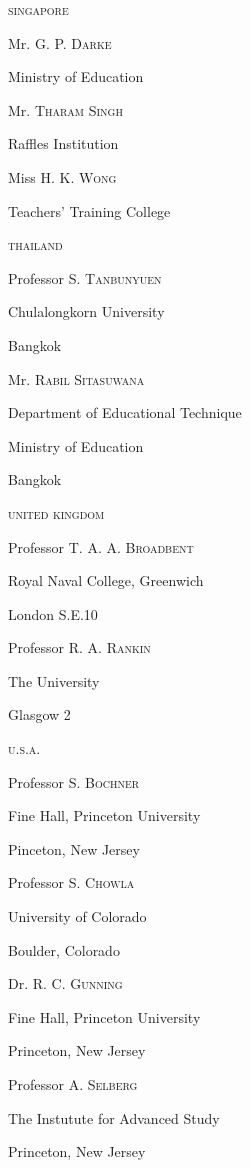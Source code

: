 \noindent
\textsc{singapore}

\quad Mr. \textsc{G. P. Darke}

\quad Ministry of Education 
\smallskip

\quad Mr. \textsc{Tharam Singh}\pageoriginale

\quad Raffles Institution
\smallskip

\quad Miss \textsc{H. K. Wong}

\quad Teachers' Training College
\medskip

\noindent
\textsc{thailand}

\quad Professor \textsc{S. Tanbunyuen}

\quad Chulalongkorn University

\quad Bangkok
\smallskip

\quad Mr. \textsc{Rabil Sitasuwana}

\quad Department of Educational Technique

\quad Ministry of Education

\quad Bangkok
\medskip

\noindent
\textsc{united kingdom}

\quad Professor \textsc{T. A. A. Broadbent}

\quad Royal Naval College, Greenwich

\quad London S.E.10
\smallskip

\quad Professor \textsc{R. A. Rankin}

\quad The University

\quad Glasgow 2
\medskip

\noindent
\textsc{u.s.a.}

\quad Professor \textsc{S. Bochner}

\quad Fine Hall, Princeton University

\quad Pinceton, New Jersey
\smallskip

\quad Professor \textsc{S. Chowla}

\quad University of Colorado

\quad Boulder, Colorado
\smallskip

\quad Dr. \textsc{R. C. Gunning}

\quad Fine Hall, Princeton University

\quad Princeton, New Jersey
\smallskip

\quad Professor \textsc{A. Selberg}\pageoriginale

\quad The Instutute for Advanced Study

\quad Princeton, New Jersey
\smallskip

